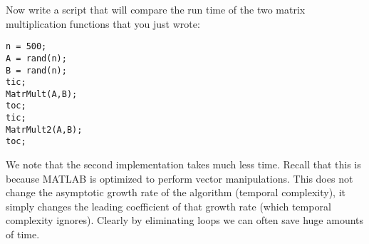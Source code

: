 Now write a script that will compare the run time of the two matrix multiplication functions that you just wrote:
\begin{lstlisting}[style=matlab]
n = 500;
A = rand(n);
B = rand(n);
tic;
MatrMult(A,B);
toc;
tic;
MatrMult2(A,B);
toc;
\end{lstlisting}

We note that the second implementation takes much less time. Recall that this is because MATLAB is optimized to perform vector manipulations. This does not change the asymptotic growth rate of the algorithm (temporal complexity), it simply changes the leading coefficient of that growth rate (which temporal complexity ignores). Clearly by eliminating loops we can often save huge amounts of time.
